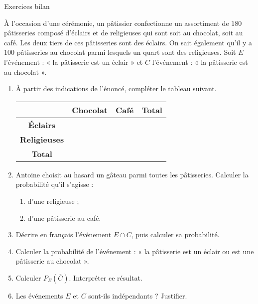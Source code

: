 \documentclass[11pt]{article}
\begin{document}
\begin{center}
  \Large
  Exercices bilan
\end{center}

\begin{exo}
  À l’occasion d’une cérémonie, un pâtissier confectionne
un assortiment de $180$ pâtisseries composé d’éclairs et de religieuses qui sont
soit au chocolat, soit au café. Les deux tiers de ces pâtisseries sont des
éclairs. On sait également qu’il y a $100$ pâtisseries au chocolat parmi
lesquels un quart sont des religieuses.
Soit $E$ l'événement : « la pâtisserie est un éclair » et $C$ l'événement : « la
pâtisserie est au chocolat ».
\begin{enumerate}
  \item À partir des indications de l'énoncé, compléter le tableau suivant.
    \begin{center}
      \def\arraystretch{1.5}
    \begin{tabular}{|c|c|c|c|}
      \hline
      & \textbf{Chocolat} & \textbf{Café} & \textbf{Total} \\
      \hline
      \textbf{Éclairs} & & & \\
      \hline
      \textbf{Religieuses} & & & \\
      \hline
      \textbf{Total} & & & \\
      \hline
    \end{tabular}
    \end{center}
  \item Antoine choisit au hasard un g\^ateau parmi toutes les p\^atisseries.
    Calculer la probabilité qu'il s'agisse :
    \begin{enumerate}
      \item d'une religieuse ;
      \item d'une p\^atisserie au café.
    \end{enumerate}
  \item Décrire en français l'événement $E\cap C$, puis calculer sa probabilité.
  \item Calculer la probabilité de l'événement : « la p\^atisserie est un éclair
    ou est une p\^atisserie au chocolat ».
  \item Calculer $P_E(\overline C)$. Interpréter ce résultat.
  \item Les événements $E$ et $C$ sont-ils indépendants ? Justifier.
\end{enumerate}
\end{exo}
\end{document}
